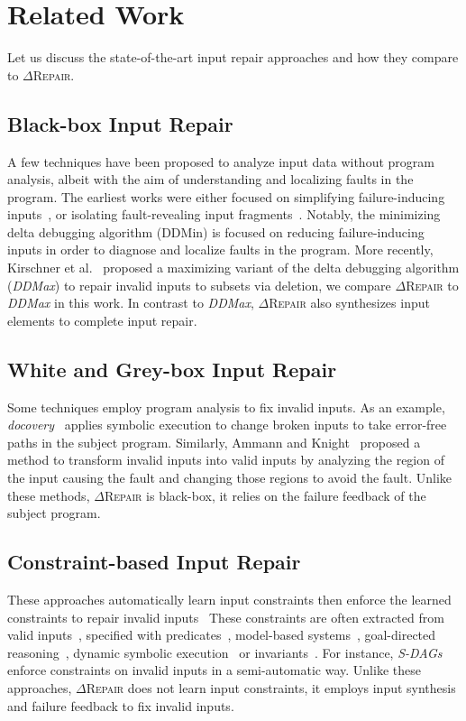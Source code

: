 \documentclass[acmsmall,screen,review,anonymous]{acmart}
\newcommand{\ddmin}{\textit{ddmin}\xspace}
\newcommand{\approach}{\textsc{$\Delta$Repair}\xspace}
\def\ddmin{DDMin\xspace}
\newcommand{\ddmax}{\textit{DDMax}\xspace}
\begin{document}
\section{Related Work}
\label{sec:related_work}

Let us discuss the state-of-the-art input repair approaches and how they compare to \approach. 

\subsection{Black-box Input Repair} 
A few techniques have been proposed to analyze input data without program analysis, albeit with the aim of understanding and localizing faults in the program. The earliest works were either focused on simplifying failure-inducing inputs~\cite{zeller2002simplifying, clause2009penumbra}, or isolating fault-revealing input fragments~\cite{hierarchicalDD, sterling2007automated}. Notably, the minimizing delta debugging algorithm (\ddmin) is focused on reducing failure-inducing inputs in order to diagnose and localize faults in the program. More recently, Kirschner et al.~\cite{kirschner2020debugging} proposed a maximizing variant of the delta debugging algorithm (\ddmax) to repair invalid inputs to subsets via deletion, we compare \approach to \ddmax in this work. In contrast to \ddmax, \approach also synthesizes input elements to complete input repair. 


\subsection{White and Grey-box Input Repair} Some techniques employ program analysis to fix invalid inputs. As an example, \emph{docovery}~\cite{docovery:ase14} applies symbolic execution to change broken inputs to take error-free paths in the subject program. Similarly, Ammann and Knight~\cite{data_diversity} proposed a method to transform invalid inputs into valid inputs by analyzing the region of the input causing the fault and changing those regions to avoid the fault. Unlike these methods, \approach 
is black-box, it relies on the failure feedback of the subject program. 


\subsection{Constraint-based Input Repair} %
These approaches automatically learn input constraints then enforce the learned constraints to repair invalid inputs~\cite{hussain2010dynamic, Demsky:2006:IED:1146238.1146266} 
These constraints are often extracted from valid inputs~\cite{Long:2012:AIR:2337223.2337233, Rinard:2007:LCZ:1297027.1297072}, specified with predicates~\cite{elkarablieh2008juzi}, model-based systems~\cite{Demsky:2003:ADR:949343.949314}, goal-directed reasoning~\cite{1553560}, dynamic symbolic execution~\cite{hussain2010dynamic} or invariants~\cite{Demsky:2006:IED:1146238.1146266}. For instance, \emph{S-DAGs}~\cite{scheffczyk2004s} enforce constraints on invalid inputs in a semi-automatic way. Unlike these approaches, \approach does not learn input constraints, it employs input synthesis and failure feedback to fix invalid inputs. 
\end{document}
